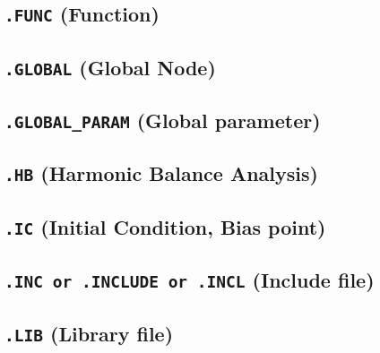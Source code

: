 \subsection{\texttt{.FUNC} (Function)}


\newpage
\subsection{\texttt{.GLOBAL} (Global Node)}


\newpage
\subsection{\texttt{.GLOBAL\_PARAM} (Global parameter)}


\newpage
\subsection{\texttt{.HB} (Harmonic Balance Analysis)}


\newpage
\subsection{\texttt{.IC} (Initial Condition, Bias point)}


\newpage
\subsection{\texttt{.INC or .INCLUDE or .INCL} (Include file)}


\newpage
\subsection{\texttt{.LIB} (Library file)}


